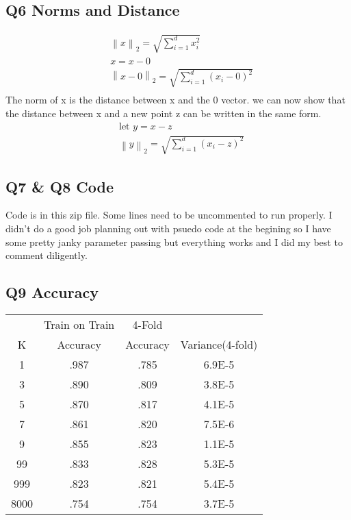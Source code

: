 \documentclass{article}
\begin{document}
\subsection*{Q6 Norms and Distance}
\newcommand{\norm}[1]{\left\lVert#1\right\rVert}
\begin{align}
    &\norm{x}_2 = \sqrt{\sum_{i=1}^dx_i^2} \\
    &x = x-0 \\
    &\norm{x-0}_2 = \sqrt{\sum_{i=1}^d(x_i-0)^2}\\
\end{align}
The norm of x is the distance between x and the 0 vector. we can now show that the distance between x and a new point z can be written in the same form.
\begin{align}
    &\text{let } y = x-z\\ 
    &\norm{y}_2 = \sqrt{\sum_{i=1}^d( x_i-z)^2}
\end{align}

\subsection*{Q7 \& Q8 Code}
Code is in this zip file. Some lines need to be uncommented to run properly. I didn't do a good job planning out with psuedo code at the begining so I have some pretty janky parameter passing but everything works and I did my best to comment diligently.

\subsection*{Q9 Accuracy}

\begin{center}
    \begin{tabular}{||c c c c||} 
    \hline
    & Train on Train& 4-Fold & \\
    K & Accuracy & Accuracy & Variance(4-fold) \\ [0.5ex] 
    \hline\hline
    1 & .987 & .785 & 6.9E-5 \\ 
    \hline
    3 & .890 & .809 & 3.8E-5 \\
    \hline
    5 & .870 & .817 & 4.1E-5 \\
    \hline
    7 & .861 & .820 & 7.5E-6 \\
    \hline
    9 & .855 & .823 & 1.1E-5 \\
    \hline
    99 & .833 & .828 & 5.3E-5 \\ [1ex] 
    \hline
    999 & .823 & .821 & 5.4E-5 \\ [1ex] 
    \hline
    8000 & .754 & .754 & 3.7E-5 \\ [1ex] 
    \hline
   \end{tabular}
   \end{center}
\end{document}
